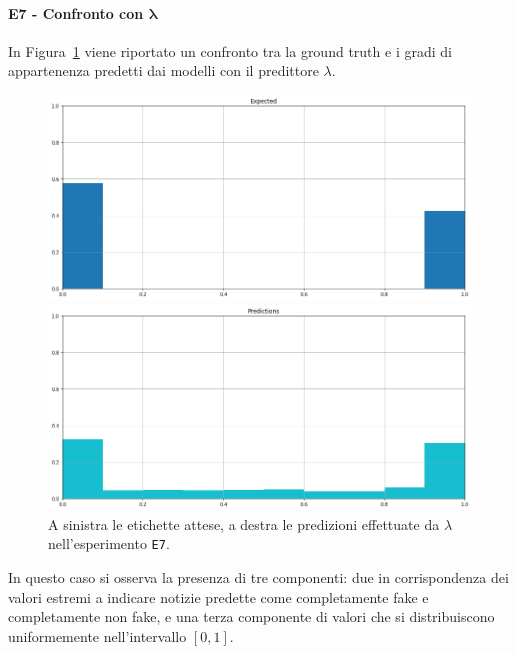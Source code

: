 \documentclass[12pt]{report}
\theoremstyle{definition}
\begin{document}
\paragraph{E7 - Confronto con $\bm{\lambda}$}
In Figura~\ref{prediction_exp7} viene riportato un confronto tra la ground truth e i gradi di appartenenza predetti dai modelli con il predittore $\lambda$.
\begin{figure}
\centering
    \begin{minipage}{0.48\textwidth}
        \includegraphics[width=\linewidth]{images/experiment_kaggle/expected_memberships.png}
    \end{minipage}
    \begin{minipage}{0.48\textwidth}
        \includegraphics[width=\linewidth]{images/experiment_kaggle/prediction_memberships.png}
    \end{minipage}
    \caption{A sinistra le etichette attese, a destra le predizioni effettuate da $\lambda$ nell'esperimento \texttt{E7}.}
    \label{prediction_exp7}
\end{figure} 
In questo caso si osserva la presenza di tre componenti: due in corrispondenza dei valori estremi a indicare notizie predette come completamente fake e completamente non fake, e una terza componente di valori che si distribuiscono uniformemente nell'intervallo $[0,1]$.
\end{document}
